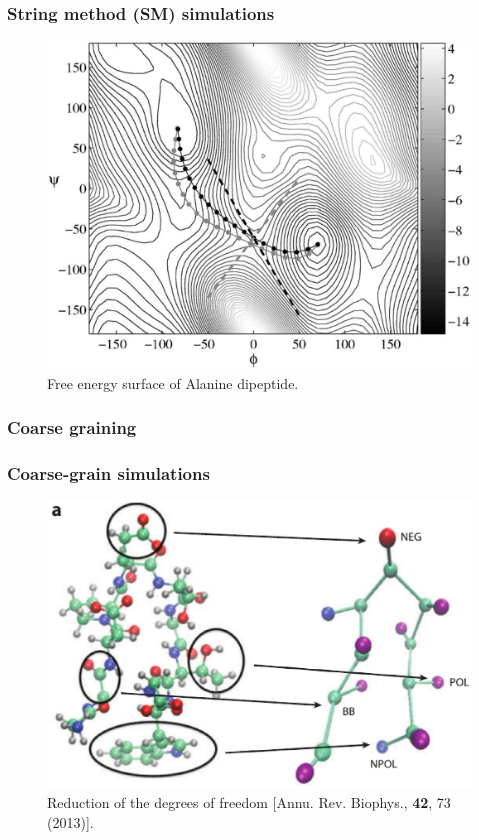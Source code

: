 \documentclass{beamer}
\begin{document}
\begin{frame}
\frametitle{String method (SM) simulations}
\begin{figure}
\includegraphics[scale=0.15]{string_fe.eps}
\caption{{\scriptsize  Free energy surface of Alanine dipeptide. }}
\end{figure}
\end{frame}


\subsubsection{Coarse graining} 


\begin{frame}
\frametitle{Coarse-grain simulations}
\begin{figure}
\includegraphics[scale=0.3]{coarse-grain.eps}
\caption{{\scriptsize  Reduction of the degrees of freedom [Annu. Rev. Biophys., {\bf 42}, 73 (2013)]. }}
\end{figure}
\end{frame}
\end{document}
